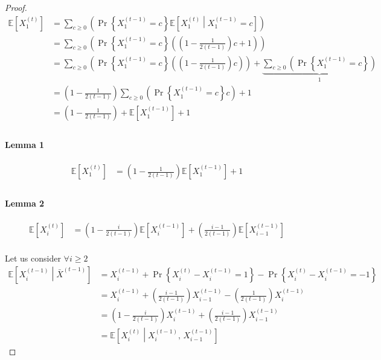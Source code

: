 \documentclass[]{article}
\begin{document}
\begin{proof}
\begin{align*}
	\mathbb{E}\left[X_1^{(t)} \right] &= \sum_{c\geq0}^{}\left( \Pr\left\{ X_1^{(t-1)} = c \right\} \mathbb{E}\left[ X_1^{(t)} \middle| X_1^{(t-1)} = c \right] \right)\\
	&= \sum_{c\geq0}^{}\left( \Pr\left\{ X_1^{(t-1)} = c \right\}\left( \left( 1 - \frac{1}{2(t-1)} \right)c + 1 \right) \right)\\
	&= \sum_{c\geq0}^{}\left( \Pr\left\{ X_1^{(t-1)} = c \right\}\left( \left( 1 - \frac{1}{2(t-1)} \right)c\right) \right) + \underbrace{\sum_{c\geq0}^{}\left( \Pr\left\{ X_1^{(t-1)} = c \right\} \right)}_\text{1}\\
	&= \left( 1 - \frac{1}{2(t-1)}\right) \sum_{c\geq0}^{}\left( \Pr\left\{ X_1^{(t-1)} = c \right\}c \right) + 1\\
	&= \left( 1 - \frac{1}{2(t-1)}\right)+ 	\mathbb{E}\left[X_1^{(t-1)} \right] + 1\\
\end{align*}

\paragraph{Lemma 1}
\begin{align*}
\mathbb{E}\left[X_1^{(t)} \right] &= \left( 1 - \frac{1}{2(t-1)}\right)\mathbb{E}\left[X_1^{(t-1)} \right] + 1\\
\end{align*}

\paragraph{Lemma 2}
\begin{align*}
\mathbb{E}\left[X_i^{(t)} \right] &= \left( 1 - \frac{i}{2(t-1)}\right)\mathbb{E}\left[X_i^{(t-1)} \right] + \left(\frac{i-1}{2(t-1)}\right)\mathbb{E}\left[X_{i-1}^{(t-1)} \right]\\
\end{align*}

Let us consider $\forall i \geq 2$
\begingroup
\addtolength{\jot}{1em}
\begin{align*}
	\mathbb{E}\left[X_i^{(t-1)} \middle| \bar{X}^{(t-1)}\right] &= X_i^{(t-1)} + \Pr\left\{ X_i^{(t)} - X_i^{(t-1)} = 1\right\} - \Pr\left\{ X_i^{(t)} - X_i^{(t-1)} = -1\right\}\\
	&= X_i^{(t-1)} + \left( \frac{i-1}{2(t-1)}\right) X_{i-1}^{(t-1)} - \left(\frac{1}{2(t-1)}\right) X_{i}^{(t-1)}\\
	&= \left(1- \frac{i}{2(t-1)}\right) X_{i}^{(t-1)} + \left( \frac{i-1}{2(t-1)}\right) X_{i-1}^{(t-1)}\\
	&= \mathbb{E}\left[X_i^{(t)} \middle| X_i^{(t-1)},\,  X_{i-1}^{(t-1)}\right]
\end{align*}
\endgroup



\end{proof}
\end{document}
